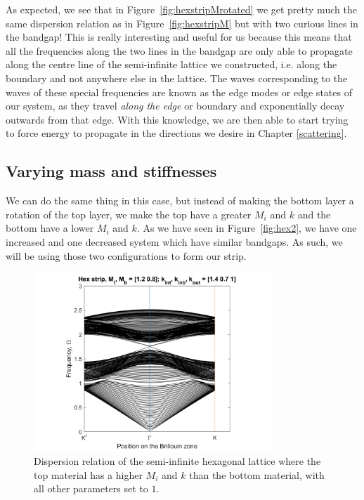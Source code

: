 As expected, we see that in Figure~\ref{fig:hexstripMrotated} we get pretty
much the same dispersion relation as in Figure~\ref{fig:hexstripM} but with two
curious lines in the bandgap! This is really interesting and useful for us
because this means that all the frequencies along the two lines in the bandgap
are only able to propagate along the centre line of the semi-infinite lattice
we constructed, i.e. along the boundary and not anywhere else in the lattice.
The waves corresponding to the waves of these special frequencies are known as
the edge modes or edge states of our system, as they travel \textit{along the
edge} or boundary and exponentially decay outwards from that edge. With this
knowledge, we are then able to start trying to force energy to propagate in the
directions we desire in Chapter \ref{scattering}.

\subsection{Varying mass and stiffnesses}
\label{perturbMk}
We can do the same thing in this case, but instead of making the bottom layer a
rotation of the top layer, we make the top have a greater $M_i$ and $k$ and the
bottom have a lower $M_i$ and $k$. As we have seen in
Figure~\ref{fig:hex2}, we have one increased and one decreased system which
have similar bandgaps. As such, we will be using those two configurations to
form our strip.

\begin{figure}[!h]
\centering
\includegraphics[width=0.8\textwidth]{imgs/hexstripperturb2.png}
\caption{\label{fig:hexstrip2} Dispersion relation of the semi-infinite
  hexagonal lattice where the top material has a higher $M_i$ and $k$ than the
  bottom material, with all other parameters set to $1$.}
\end{figure}

